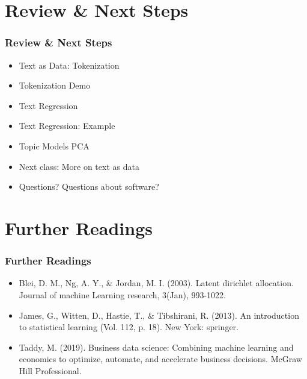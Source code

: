 \documentclass[
  shownotes,
  xcolor={svgnames},
  hyperref={colorlinks,citecolor=DarkBlue,linkcolor=DarkRed,urlcolor=DarkBlue}
  , aspectratio=169]{beamer}
\begin{document}
\section{Review
 \& Next Steps}
\begin{frame}
\frametitle{Review \& Next Steps}
  
\begin{itemize} 
  
\item Text as Data: Tokenization
\item Tokenization Demo
\item Text Regression
\item Text Regression: Example
\item Topic Models PCA
    \bigskip  
  \item  Next class:  More on text as data


\bigskip  
\item Questions? Questions about software? 

\end{itemize}
\end{frame}
\section{Further Readings}
\begin{frame}
\frametitle{Further Readings}

\begin{itemize}
  \item Blei, D. M., Ng, A. Y., \& Jordan, M. I. (2003). Latent dirichlet allocation. Journal of machine Learning research, 3(Jan), 993-1022.

  \medskip
  \item James, G., Witten, D., Hastie, T., \& Tibshirani, R. (2013). An introduction to statistical learning (Vol. 112, p. 18). New York: springer.
  \medskip
  \item Taddy, M. (2019). Business data science: Combining machine learning and economics to optimize, automate, and accelerate business decisions. McGraw Hill Professional.

  
\end{itemize}

\end{frame}
\end{document}
